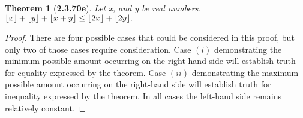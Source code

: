 \documentclass[a4paper, 12pt]{article}
\theoremstyle{plain}
\newtheorem*{theorem*}{Theorem}
\DeclarePairedDelimiter{\floor}{\lfloor}{\rfloor}
\begin{document}
\pagebreak


\begin{theorem*}[\textbf{2.3.70e}]
    Let x, and y be real numbers. 
    $\floor{x} + \floor{y} + \floor{x + y} \le \floor{2x} + \floor{2y}.$
\end{theorem*}

\begin{proof}
    There are four possible cases that could be considered in this proof, but only two of 
    those cases require consideration. Case $(i)$ demonstrating the minimum possible amount 
    occurring on the right-hand side will establish truth for equality expressed by the 
    theorem. Case $(ii)$ demonstrating the maximum possible amount occurring on the right-hand 
    side will establish truth for inequality expressed by the theorem. In all cases the 
    left-hand side remains relatively constant.
    

\end{proof}
\end{document}
